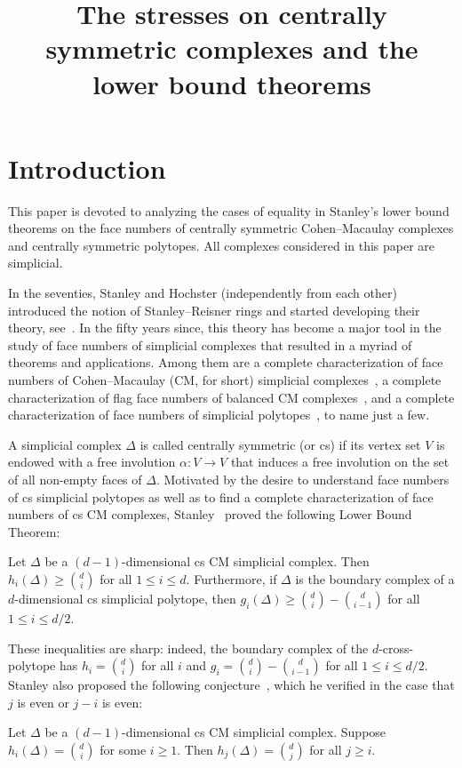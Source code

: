\documentclass[ALCO,ThmDefs,Unicode,epreuves]{cedram}
\author{\firstname{Isabella} \lastname{Novik}}
\author{\firstname{Hailun} \lastname{Zheng}}
\title{The stresses on centrally symmetric complexes and the lower bound theorems}
\begin{document}
\maketitle

\section{Introduction}
This paper is devoted to analyzing the cases of equality in Stanley's lower bound theorems on the face numbers of centrally symmetric Cohen--Macaulay complexes and centrally symmetric polytopes. All complexes considered in this paper are simplicial.

In the seventies, Stanley and Hochster (independently from each other) introduced the notion of Stanley--Reisner rings and started developing their theory, see~\cite{Hochster, Reisner, Stanley75, Stanley77}. In the fifty years since, this theory has become a major tool in the study of face numbers of simplicial complexes that resulted in a myriad of theorems and applications. Among them are a complete characterization of face numbers of Cohen--Macaulay (CM, for short) simplicial complexes~\cite{Stanley77}, a complete characterization of flag face numbers of balanced CM complexes~\cite{BjorFranklSta,Stanley79}, and a complete characterization of face numbers of simplicial polytopes~\cite{BilleraLee, Stanley80}, to name just a few.

A simplicial complex $\Delta$ is called centrally symmetric (or cs) if its vertex set $V$ is endowed with a free involution $\alpha: V \to V$ that induces a free involution on the set of all non-empty faces of $\Delta$. Motivated by the desire to understand face numbers of cs simplicial polytopes as well as to find a complete characterization of face numbers of cs CM complexes, Stanley~\cite[Theorems 3.1 and 4.1]{Stanley-87} proved the following Lower Bound Theorem:
\begin{theorem} \label{Stanley-LBT-v1}
	Let $\Delta$ be a $(d-1)$-dimensional cs CM simplicial complex. Then $h_i(\Delta)\geq \binom{d}{i}$ for all $1\leq i\leq d$. Furthermore, if $\Delta$ is the boundary complex of a $d$-dimensional cs simplicial polytope, then $g_i(\Delta)\geq \binom{d}{i}-\binom{d}{i-1}$ for all $1\leq i\leq d/2$.
\end{theorem}
\noindent These inequalities are sharp: indeed, the boundary complex of the $d$-cross-polytope has $h_i=\binom{d}{i}$ for all $i$ and $g_i=\binom{d}{i}-\binom{d}{i-1}$ for all $1\leq i\leq d/2$. Stanley also proposed the following conjecture~\cite[Conjecture 3.5]{Stanley-87}, which he verified in the case that $j$ is even or $j-i$ is even:
\begin{conjecture}\label{conj}
	Let $\Delta$ be a $(d-1)$-dimensional cs CM simplicial complex. Suppose $h_i(\Delta)=\binom{d}{i}$ for some $i\geq 1$. Then $h_j(\Delta)=\binom{d}{j}$ for all $j\geq i$.
\end{conjecture}
\end{document}
